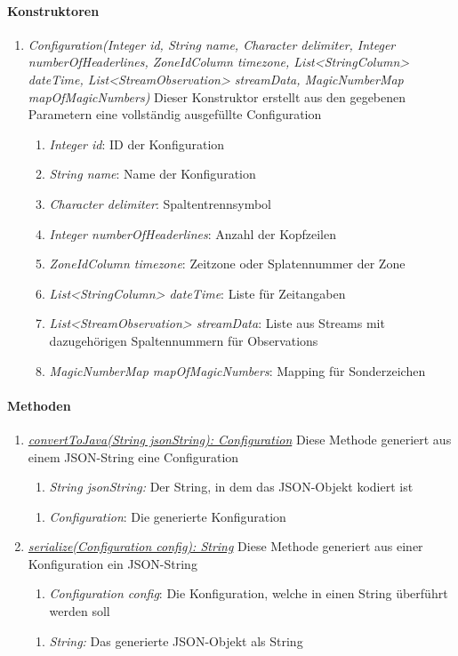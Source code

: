 \paragraph{Konstruktoren}
\begin{enumerate}[+]
	\item \textit{Configuration(Integer id, String name, Character delimiter, Integer numberOfHeaderlines, ZoneIdColumn timezone, List<StringColumn> dateTime, List<StreamObservation> streamData, MagicNumberMap mapOfMagicNumbers)} Dieser Konstruktor erstellt aus den gegebenen Parametern eine vollständig ausgefüllte Configuration
	\begin{enumerate}[$\bullet$]
		\item \textit{Integer id}: ID der Konfiguration
		\item \textit{String name}: Name der Konfiguration
		\item \textit{Character delimiter}: Spaltentrennsymbol
		\item \textit{Integer numberOfHeaderlines}: Anzahl der Kopfzeilen
		\item \textit{ZoneIdColumn timezone}: Zeitzone oder Splatennummer der Zone
		\item \textit{List<StringColumn> dateTime}: Liste für Zeitangaben
		\item \textit{List<StreamObservation> streamData}: Liste aus Streams mit dazugehörigen Spaltennummern für Observations
		\item \textit{MagicNumberMap mapOfMagicNumbers}: Mapping für Sonderzeichen
	\end{enumerate}
\end{enumerate}

\paragraph{Methoden}
\begin{enumerate}[+]
	\item \textit{\underline{convertToJava(String jsonString): Configuration}} Diese Methode generiert aus einem JSON-String eine Configuration
	\begin{enumerate}[$\bullet$]
		\item \textit{String jsonString:} Der String, in dem das JSON-Objekt kodiert ist
	\end{enumerate}
	\begin{enumerate}[$\circ$]
		\item \textit{Configuration}: Die generierte Konfiguration
	\end{enumerate}
	
	\item \textit{\underline{serialize(Configuration config): String}} Diese Methode generiert aus einer Konfiguration ein JSON-String
	\begin{enumerate}[$\bullet$]
		\item \textit{Configuration config}: Die Konfiguration, welche in einen String überführt werden soll
	\end{enumerate}
	\begin{enumerate}[$\circ$]
		\item \textit{String:} Das generierte JSON-Objekt als String
	\end{enumerate}
\end{enumerate}
